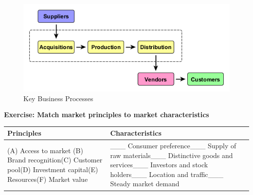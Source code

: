 \documentclass[]{book}
\let\BeginKnitrBlock\begin \let\EndKnitrBlock\end
\begin{document}
\begin{figure}
\centering
\includegraphics{images/businessprocess.png}
\caption{Key Business Processes}
\end{figure}

\BeginKnitrBlock{rmdexercise}
\textbf{Exercise: Match market principles to market characteristics}

\begin{longtable}[]{@{}ll@{}}
\toprule
\begin{minipage}[b]{0.44\columnwidth}\raggedright
Principles\strut
\end{minipage} & \begin{minipage}[b]{0.50\columnwidth}\raggedright
Characteristics\strut
\end{minipage}\tabularnewline
\midrule
\endhead
\begin{minipage}[t]{0.44\columnwidth}\raggedright
(A) Access to market \newline(B) Brand recognition\newline (C) Customer pool\newline(D) Investment capital\newline(E) Resources\newline(F) Market value\strut
\end{minipage} & \begin{minipage}[t]{0.50\columnwidth}\raggedright
\_\_\_ Consumer preference\newline  \_\_\_ Supply of raw materials\newline \_\_\_ Distinctive goods and services\newline\_\_\_ Investors and stock holders\newline \_\_\_ Location and traffic\newline\_\_\_ Steady market demand\strut
\end{minipage}\tabularnewline
\bottomrule
\end{longtable}
\EndKnitrBlock{rmdexercise}
\end{document}
